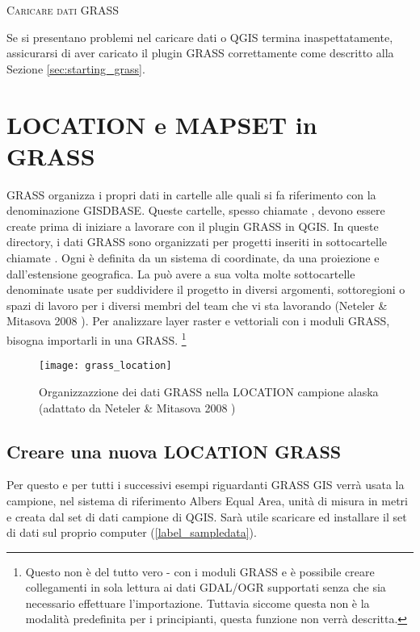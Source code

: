 \begin{Tip}\caption{\textsc{Caricare dati GRASS}}
Se si presentano problemi nel caricare dati o QGIS termina
inaspettatamente, assicurarsi di aver caricato il plugin GRASS correttamente
come descritto alla Sezione \ref{sec:starting_grass}.
\end{Tip} 

\section{LOCATION e MAPSET in GRASS}\label{sec:about_loc}

GRASS organizza i propri dati in cartelle alle quali si fa riferimento con la
denominazione GISDBASE. Queste cartelle, spesso chiamate ,
devono essere create prima di iniziare a lavorare con il plugin GRASS in QGIS.
In queste directory, i dati GRASS sono organizzati per progetti inseriti in
sottocartelle chiamate . 
Ogni  è definita da un sistema di coordinate, da una 
proiezione e dall'estensione geografica. La  può avere a
sua volta molte sottocartelle denominate  usate per suddividere il
progetto in diversi argomenti, sottoregioni o spazi di lavoro per i diversi
membri del team che vi sta lavorando (Neteler \& Mitasova 2008
\cite{neteler_mitasova08}). Per analizzare layer raster e vettoriali con i
moduli GRASS, bisogna importarli in una  GRASS.
\footnote{Questo non è del tutto vero - con i moduli GRASS 
e  è possibile creare collegamenti in sola lettura ai
dati GDAL/OGR supportati senza che sia necessario effettuare l'importazione.
Tuttavia siccome questa non è la modalità predefinita per i principianti, 
questa funzione non verrà descritta.}

\begin{figure}[ht]
\centering
\texttt{[image: grass\_location]}
\caption{Organizzazzione dei dati GRASS nella LOCATION campione alaska
(adattato da Neteler \& Mitasova 2008 \cite{neteler_mitasova08})}\label{fig:grass_location}
\end{figure}

\subsection{Creare una nuova LOCATION GRASS}\label{sec:create_loc}

Per questo e per tutti i successivi esempi riguardanti GRASS GIS verrà usata la  campione, nel sistema di riferimento Albers Equal Area, unità di misura in metri e 
creata dal set di dati campione di QGIS. Sarà utile scaricare
ed installare il set di dati sul proprio computer (\ref{label_sampledata}).

